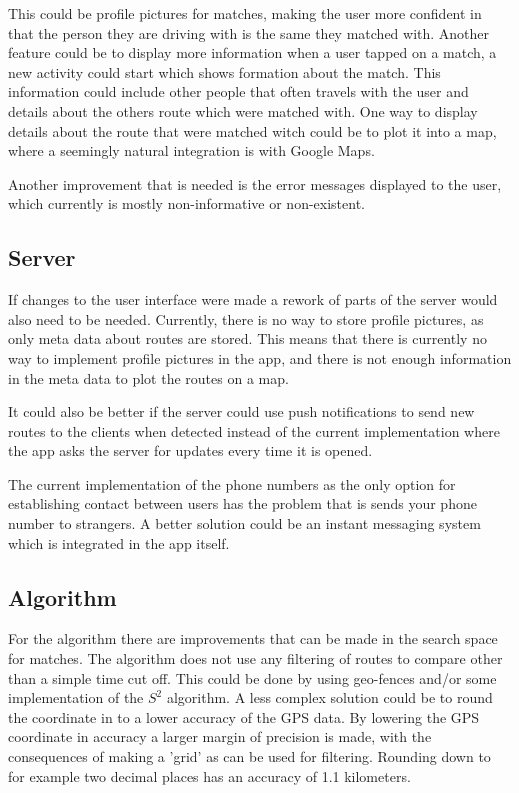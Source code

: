 This could be profile pictures for matches, making the user more confident in that the person they are driving with is the same they matched with.
Another feature could be to display more information when a user tapped on a match, a new activity could start which shows formation about the match.
This information could include other people that often travels with the user and details about the others route which were matched with.
One way to display details about the route that were matched witch could be to plot it into a map, where a seemingly natural integration is with Google Maps.

Another improvement that is needed is the error messages displayed to the user, which currently is mostly non-informative or non-existent.

\subsection{Server}
If changes to the user interface were made a rework of parts of the server would also need to be needed.
Currently, there is no way to store profile pictures, as only meta data about routes are stored.
This means that there is currently no way to implement profile pictures in the app, and there is not enough information in the meta data to plot the routes on a map.

It could also be better if the server could use push notifications to send new routes to the clients when detected instead of the current implementation where the app asks the server for updates every time it is opened.

The current implementation of the phone numbers as the only option for establishing contact between users has the problem that is sends your phone number to strangers.
A better solution could be an instant messaging system which is integrated in the app itself.

\subsection{Algorithm}
For the algorithm there are improvements that can be made in the search space for matches.
The algorithm does not use any filtering of routes to compare other than a simple time cut off.
This could be done by using geo-fences and/or some implementation of the $S^2$ algorithm.
A less complex solution could be to round the coordinate in to a lower accuracy of the GPS data.
By lowering the GPS coordinate in accuracy a larger margin of precision is made, with the consequences of making a 'grid' as can be used for filtering.
Rounding down to for example two decimal places has an accuracy of 1.1 kilometers.

